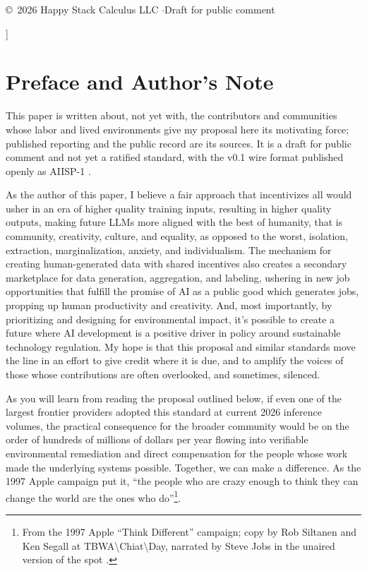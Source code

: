 \documentclass[10pt,a4paper,twocolumn]{article}
\begin{document}
{\vspace{6pt}
\begin{center}
{\scriptsize\copyright\ 2026 Happy Stack Calculus LLC \quad$\cdot$\quad Draft for public comment\par}
\end{center}
}]

\onecolumn
{\small\tableofcontents}

\newpage
\section*{Preface and Author's Note}

This paper is written about, not yet with, the contributors and communities whose labor and lived environments give my proposal here its motivating force; published reporting and the public record are its sources. It is a draft for public comment and not yet a ratified standard, with the v0.1 wire format published openly as AIISP-1 \citep{aiisp1spec2026}.

As the author of this paper, I believe a fair approach that incentivizes all would usher in an era of higher quality training inputs, resulting in higher quality outputs, making future LLMs more aligned with the best of humanity, that is community, creativity, culture, and equality, as opposed to the worst, isolation, extraction, marginalization, anxiety, and individualism. The mechanism for creating human-generated data with shared incentives also creates a secondary marketplace for data generation, aggregation, and labeling, ushering in new job opportunities that fulfill the promise of AI as a public good which generates jobs, propping up human productivity and creativity. And, most importantly, by prioritizing and designing for environmental impact, it's possible to create a future where AI development is a positive driver in policy around sustainable technology regulation. My hope is that this proposal and similar standards move the line in an effort to give credit where it is due, and to amplify the voices of those whose contributions are often overlooked, and sometimes, silenced.

As you will learn from reading the proposal outlined below, if even one of the largest frontier providers adopted this standard at current 2026 inference volumes, the practical consequence for the broader community would be on the order of hundreds of millions of dollars per year flowing into verifiable environmental remediation and direct compensation for the people whose work made the underlying systems possible. Together, we can make a difference. As the 1997 Apple campaign put it, ``the people who are crazy enough to think they can change the world are the ones who do''\footnote{From the 1997 Apple ``Think Different'' campaign; copy by Rob Siltanen and Ken Segall at TBWA\textbackslash{}Chiat\textbackslash{}Day, narrated by Steve Jobs in the unaired version of the spot \citep{jobs1997thinkdifferent}.}.
\end{document}
